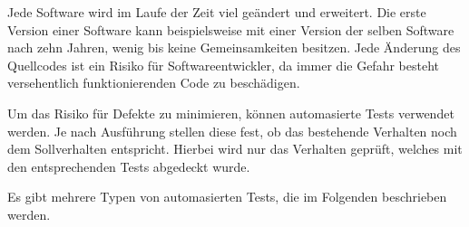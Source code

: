 Jede Software wird im Laufe der Zeit viel geändert und erweitert.
Die erste Version einer Software kann beispielsweise 
mit einer Version der selben Software nach zehn Jahren, wenig bis keine Gemeinsamkeiten besitzen.
Jede Änderung des Quellcodes ist ein Risiko für Softwareentwickler, da immer die Gefahr besteht versehentlich funktionierenden Code zu beschädigen.

Um das Risiko für Defekte zu minimieren, können automasierte Tests verwendet werden. Je nach Ausführung stellen diese fest,
ob das bestehende Verhalten noch dem Sollverhalten entspricht. Hierbei wird nur das Verhalten geprüft, 
welches mit den entsprechenden Tests abgedeckt wurde.

Es gibt mehrere Typen von automasierten Tests, die im Folgenden beschrieben werden.

